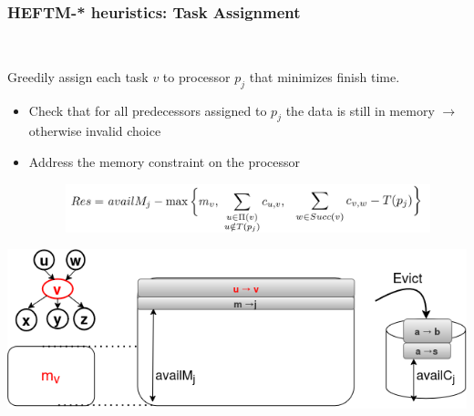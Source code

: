 \documentclass[xcolor=svgnames,titlepage,english,presentation]{beamer}
\begin{document}
\begin{frame}[t]
    \frametitle{HEFTM-* heuristics: Task Assignment}
    ~~~~~

    Greedily assign each task $v$ to processor $p_j$ that minimizes finish time.

    \begin{itemize}
        \item Check that for all predecessors assigned to $p_j$ the data is still in memory $\rightarrow$ otherwise invalid choice
        \item Address the memory constraint on the processor \\

        \begin{figure}
            \centering
            \includegraphics[width=.7\textwidth]{diagrams/images/Res-formula}
        \end{figure}
    \end{itemize}

    \begin{center}
            \includegraphics[scale=0.4]{diagrams/images/CCgridEvict2}
    \end{center}

\end{frame}
\end{document}
